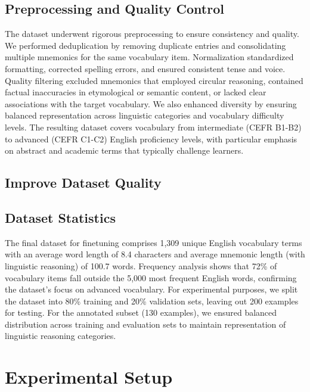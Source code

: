 \documentclass{article}
\begin{document}
\subsection{Preprocessing and Quality Control} \label{sec:preprocessing}
The dataset underwent rigorous preprocessing to ensure consistency and quality. We performed deduplication by removing duplicate entries and consolidating multiple mnemonics for the same vocabulary item. Normalization standardized formatting, corrected spelling errors, and ensured consistent tense and voice. Quality filtering excluded mnemonics that employed circular reasoning, contained factual inaccuracies in etymological or semantic content, or lacked clear associations with the target vocabulary. We also enhanced diversity by ensuring balanced representation across linguistic categories and vocabulary difficulty levels. The resulting dataset covers vocabulary from intermediate (CEFR B1-B2) to advanced (CEFR C1-C2) English proficiency levels, with particular emphasis on abstract and academic terms that typically challenge learners.

\subsection{Improve Dataset Quality} \label{sec:improve-dataset}


\subsection{Dataset Statistics} \label{sec:dataset-stats}
The final dataset for finetuning comprises 1,309 unique English vocabulary terms with an average word length of 8.4 characters and average mnemonic length (with linguistic reasoning) of 100.7 words. Frequency analysis shows that 72\% of vocabulary items fall outside the 5,000 most frequent English words, confirming the dataset's focus on advanced vocabulary. For experimental purposes, we split the dataset into 80\% training and 20\% validation sets, leaving out 200 examples for testing. For the annotated subset (130 examples), we ensured balanced distribution across training and evaluation sets to maintain representation of linguistic reasoning categories.

\section{Experimental Setup} \label{sec:experiments}
\end{document}
